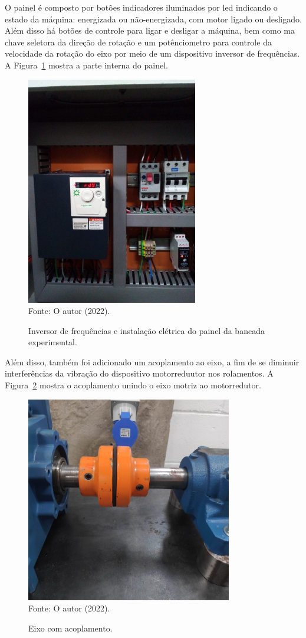 \documentclass[
	12pt,				
	oneside,			
	a4paper,			
	english,			
	brazil,			
	]{abntex2ppgsi}
\begin{document}
O painel é composto por botões indicadores iluminados por led indicando o estado da máquina: energizada ou não-energizada, com motor ligado ou desligado. Além disso há botões de controle para ligar e desligar a máquina, bem como ma chave seletora da direção de rotação e um potênciometro para controle da velocidade da rotação do eixo por meio de um dispositivo inversor de frequências. A Figura~\ref{painel_por_dentro} mostra a parte interna do painel.
 
\begin{figure}[H]
\centering
\caption {Inversor de frequências e instalação elétrica do painel da bancada experimental.}
\includegraphics[width=\textwidth,height=100mm,keepaspectratio,angle=-90]{painel_por_dentro} \\
Fonte: O autor (2022).
\label{painel_por_dentro}
\end{figure}

Além disso, também foi adicionado um acoplamento ao eixo, a fim de se diminuir interferências da vibração do dispositivo motorreduutor nos rolamentos. A Figura~\ref{acoplamento_eixo} mostra o acoplamento unindo o eixo motriz ao motorredutor. 

\begin{figure}[H]
\centering
\caption {Eixo com acoplamento.} 
\includegraphics[width=\textwidth,height=90mm,keepaspectratio]{acoplamento_eixo} \\
Fonte: O autor (2022).
\label{acoplamento_eixo}
\end{figure}
 
\end{document}
